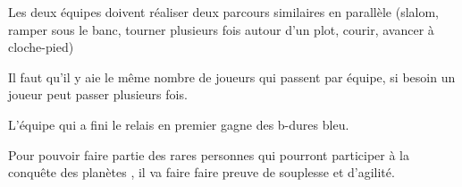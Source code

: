 \documentclass{grand-jeu}
\begin{document}
\begin{liste-materiel}
\end{liste-materiel}

\begin{regles}
Les deux équipes doivent réaliser deux parcours similaires en parallèle (slalom, ramper sous le banc, tourner plusieurs fois autour d'un plot, courir, avancer à cloche-pied)

Il faut qu'il y aie le même nombre de joueurs qui passent par équipe, si besoin un joueur peut passer plusieurs fois.

L'équipe qui a fini le relais en premier gagne des b-dures bleu. 
\end{regles}

\begin{imaginaire}
Pour pouvoir faire partie des rares personnes qui pourront participer à la conquête des planètes , il va faire faire preuve de souplesse et d'agilité. 

\end{imaginaire}

\begin{moments-stop}
\end{moments-stop}
\end{document}
